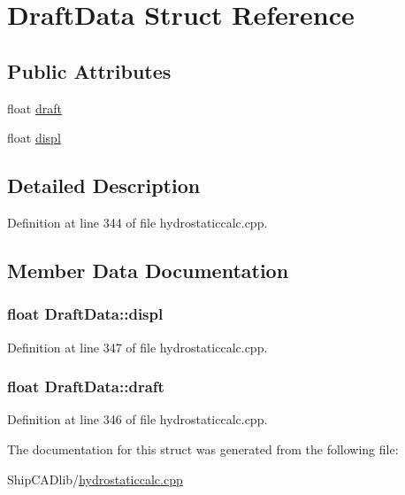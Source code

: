\hypertarget{structDraftData}{\section{Draft\-Data Struct Reference}
\label{structDraftData}
}
\subsection*{Public Attributes}
\begin{DoxyCompactItemize}
\item 
float \hyperlink{structDraftData_a3f20aeee5cac97b57e9fc5c5315f3ad1}{draft}
\item 
float \hyperlink{structDraftData_ad911e175c740aa5e4e1bba6f5db3b448}{displ}
\end{DoxyCompactItemize}


\subsection{Detailed Description}


Definition at line 344 of file hydrostaticcalc.\-cpp.



\subsection{Member Data Documentation}
\hypertarget{structDraftData_ad911e175c740aa5e4e1bba6f5db3b448}{
\subsubsection[{displ}]{\setlength{\rightskip}{0pt plus 5cm}float Draft\-Data\-::displ}}\label{structDraftData_ad911e175c740aa5e4e1bba6f5db3b448}


Definition at line 347 of file hydrostaticcalc.\-cpp.

\hypertarget{structDraftData_a3f20aeee5cac97b57e9fc5c5315f3ad1}{
\subsubsection[{draft}]{\setlength{\rightskip}{0pt plus 5cm}float Draft\-Data\-::draft}}\label{structDraftData_a3f20aeee5cac97b57e9fc5c5315f3ad1}


Definition at line 346 of file hydrostaticcalc.\-cpp.



The documentation for this struct was generated from the following file\-:\begin{DoxyCompactItemize}
\item 
Ship\-C\-A\-Dlib/\hyperlink{hydrostaticcalc_8cpp}{hydrostaticcalc.\-cpp}\end{DoxyCompactItemize}
